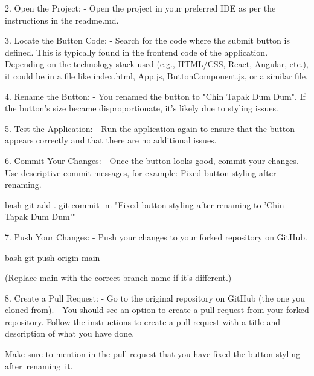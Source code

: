 \documentclass[a4paper,12pt]{article}
\begin{document}
2. Open the Project:
   - Open the project in your preferred IDE as per the instructions in the readme.md.\\
\vspace{1cm}

3. Locate the Button Code:
   - Search for the code where the submit button is defined. This is typically found in the frontend code of the application. Depending on the technology stack used (e.g., HTML/CSS, React, Angular, etc.), it could be in a file like index.html, App.js, ButtonComponent.js, or a similar file.\\
\vspace{1cm}

4. Rename the Button:
   - You renamed the button to "Chin Tapak Dum Dum". If the button’s size became disproportionate, it’s likely due to styling issues.\\
\vspace{1cm}

5. Test the Application:
   - Run the application again to ensure that the button appears correctly and that there are no additional issues.\\
\vspace{1cm}

6. Commit Your Changes:
   - Once the button looks good, commit your changes. Use descriptive commit messages, for example: Fixed button styling after renaming.

   bash
   git add .
   git commit -m "Fixed button styling after renaming to 'Chin Tapak Dum Dum'"
   \\
\vspace{1cm}
   
7. Push Your Changes:
   - Push your changes to your forked repository on GitHub.

   bash
   git push origin main
   

   (Replace main with the correct branch name if it's different.)\\
\vspace{1cm}
   
8. Create a Pull Request:
   - Go to the original repository on GitHub (the one you cloned from).
   - You should see an option to create a pull request from your forked repository. Follow the instructions to create a pull request with a title and description of what you have done.

   Make sure to mention in the pull request that you have fixed the button styling after renaming it.
\end{document}
